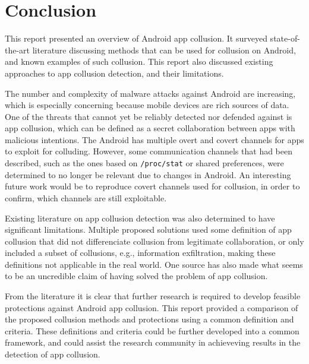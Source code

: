 \documentclass[article]{aaltoseries}
\renewcommand\gls\cgls
\begin{document}
\section{Conclusion}
\label{sec:conclusion}

This report presented an overview of Android app collusion. It surveyed state-of-the-art literature discussing methods that can be used for collusion on Android, and known examples of such collusion. This report also discussed existing approaches to app collusion detection, and their limitations.

The number and complexity of malware attacks against Android are increasing, which is especially concerning because mobile devices are rich sources of data. One of the threats that cannot yet be reliably detected nor defended against is app collusion, which can be defined as a secret collaboration between apps with malicious intentions. The Android \gls{os} has multiple overt and covert channels for apps to exploit for colluding. However, some communication channels that had been described, such as the ones based on \texttt{/proc/stat} or shared preferences, were determined to no longer be relevant due to changes in Android. An interesting future work would be to reproduce covert channels used for collusion, in order to confirm, which channels are still exploitable.

Existing literature on app collusion detection was also determined to have significant limitations. Multiple proposed solutions used some definition of app collusion that did not differenciate collusion from legitimate collaboration, or only included a subset of collusions, e.g., information exfiltration, making these definitions not applicable in the real world. One source has also made what seems to be an uncredible claim of having solved the problem of app collusion. 

From the literature it is clear that further research is required to develop feasible protections against Android app collusion. This report provided a comparison of the proposed collusion methods and protections using a common definition and criteria. These definitions and criteria could be further developed into a common framework, and could assist the research community in achieveving results in the detection of app collusion.




\end{document}
